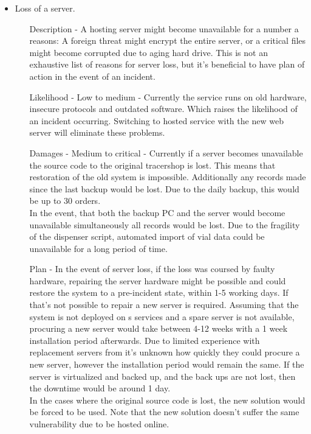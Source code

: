 \documentclass{article}
\begin{document}
\begin{itemize}
  \item Loss of a server.
  \begin{itemize}
    \item[Description] - A hosting server might become unavailable for a number a reasons:
      A foreign threat might encrypt the entire server, or a critical files might become corrupted due to aging hard drive.
      This is not an exhaustive list of reasons for server loss, but it's beneficial to have plan of action in the event of an incident.
    \item[Likelihood] - Low to medium - Currently the service runs on old hardware, insecure protocols and outdated software.
    Which raises the likelihood of an incident occurring. Switching to  hosted service with the new web server will eliminate these problems.
    \item[Damages] - Medium to critical - Currently if a server becomes unavailable the source code to the original tracershop is lost.
    This means that restoration of the old system is impossible. Additionally any records made since the last backup would be lost.
    Due to the daily backup, this would be up to 30 orders.\\
    In the event, that both the backup PC and the server would become unavailable simultaneously all records would be lost.
    Due to the fragility of the dispenser script, automated import of vial data could be unavailable for a long period of time.
    \item[Plan] - In the event of server loss, if the loss was coursed by faulty hardware, repairing the server hardware might be possible and could restore the system to a pre-incident state, within 1-5 working days.
    If that's not possible to repair a new server is required. Assuming that the system is not deployed on s services and a spare server is not available,
    procuring a new server would take between 4-12 weeks with a 1 week installation period afterwards. Due to limited experience with replacement servers from  it's unknown how quickly they could procure a new server, however the installation period would remain the same.
    If the server is virtualized and backed up, and the back ups are not lost, then the downtime would be around 1 day.\\
    In the cases where the original source code is lost, the new solution would be forced to be used. Note that the new solution doesn't suffer the same vulnerability due to be hosted online.

\end{itemize}
\end{itemize}
\end{document}
